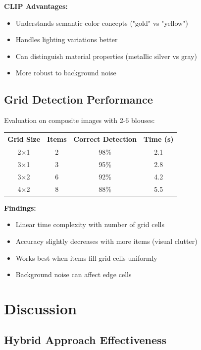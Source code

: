 \documentclass[12pt,a4paper]{report}
\begin{document}
\textbf{CLIP Advantages:}
\begin{itemize}
    \item Understands semantic color concepts ("gold" vs "yellow")
    \item Handles lighting variations better
    \item Can distinguish material properties (metallic silver vs gray)
    \item More robust to background noise
\end{itemize}

\subsection{Grid Detection Performance}

Evaluation on composite images with 2-6 blouses:

\begin{center}
\begin{tabular}{|c|c|c|c|}
\hline
\textbf{Grid Size} & \textbf{Items} & \textbf{Correct Detection} & \textbf{Time (s)} \\
\hline
2×1 & 2 & 98\% & 2.1 \\
3×1 & 3 & 95\% & 2.8 \\
3×2 & 6 & 92\% & 4.2 \\
4×2 & 8 & 88\% & 5.5 \\
\hline
\end{tabular}
\end{center}

\textbf{Findings:}
\begin{itemize}
    \item Linear time complexity with number of grid cells
    \item Accuracy slightly decreases with more items (visual clutter)
    \item Works best when items fill grid cells uniformly
    \item Background noise can affect edge cells
\end{itemize}

\section{Discussion}

\subsection{Hybrid Approach Effectiveness}
\end{document}
